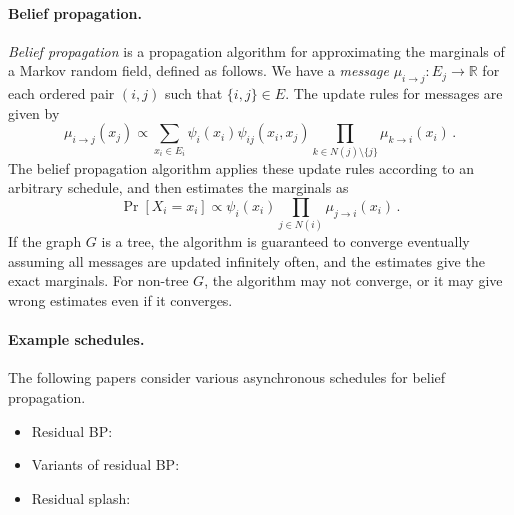 \documentclass[11pt,a4paper]{article}
\theoremstyle{remark}
\newcommand{\Reals}{\mathbb{R}}
\newcommand{\range}{E}
\begin{document}
\paragraph{Belief propagation.} \emph{Belief propagation} is a propagation algorithm for approximating the marginals of a Markov random field, defined as follows. We have a \emph{message} $\mu_{i \to j} \colon \range_j \to \Reals$ for each ordered pair $(i,j)$ such that $\{ i,j \} \in E$. The update rules for messages are given by
\[ \mu_{i \to j}(x_j) \propto \sum_{x_i \in \range_i} \psi_i(x_i)\psi_{ij}(x_i,x_j) \prod_{k \in N(j)\setminus \{ j \}} \mu_{k \to i} (x_i)\,.\] 
The belief propagation algorithm applies these update rules according to an arbitrary schedule, and then estimates the marginals as
\[ \Pr[ X_i = x_i ] \propto \psi_i(x_i) \prod_{j \in N(i)} \mu_{j \to i}(x_i)\,.\]
If the graph $G$ is a tree, the algorithm is guaranteed to converge eventually assuming all messages are updated infinitely often, and the estimates give the exact marginals. For non-tree $G$, the algorithm may not converge, or it may give wrong estimates even if it converges.

\paragraph{Example schedules.} The following papers consider various asynchronous schedules for belief propagation.
\begin{itemize}[noitemsep]
    \item Residual BP: \cite{elidan2006residual}
    \item Variants of residual BP: \cite{10.1007/978-3-319-23525-7_18, Sutton:2007:IDS:3020488.3020534}
    \item Residual splash: \cite{pmlr-v5-gonzalez09a}
\end{itemize}
\end{document}
